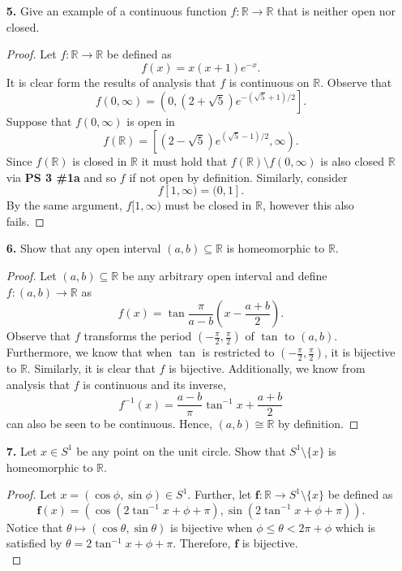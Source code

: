 \documentclass[ 12pt ]{article}
\begin{document}
\begin{enumerate}
	\item[\textbf{5.}] Give an example of a continuous function $f : \mathbb{R} \to \mathbb{R}$ that is neither open nor closed.

		\begin{proof}
			Let $f : \mathbb{R} \to \mathbb{R}$ be defined as $$f(x) = x(x+1)e^{-x}.$$ It is clear form the results of analysis that $f$ is continuous on $\mathbb{R}$. Observe that
			$$f(0, \infty) = \left ( 0, (2 + \sqrt{5})e^{-(\sqrt{5} + 1)/2} \right ].$$ Suppose that $f(0, \infty)$ is open in $$f(\mathbb{R}) = \left [ (2 - \sqrt{5})e^{(\sqrt{5} - 1)/2},
			\infty \right ).$$ Since $f(\mathbb{R})$ is closed in $\mathbb{R}$ it must hold that $f(\mathbb{R}) \setminus f(0, \infty)$ is also closed $\mathbb{R}$ via \textbf{PS 3 \#1a}
			and so $f$ if not open by definition. Similarly, consider $$f[1, \infty) = (0, 1].$$ By the same argument, $f[1, \infty)$ must be closed in $\mathbb{R}$, however this also
			fails.
		\end{proof}


	\item[\textbf{6.}] Show that any open interval $(a, b) \subseteq \mathbb{R}$ is homeomorphic to $\mathbb{R}$.

		\begin{proof}
			Let $(a, b) \subseteq \mathbb{R}$ be any arbitrary open interval and define $f : (a, b) \to \mathbb{R}$ as $$f(x) = \tan \frac{\pi}{a-b}\left(x - \frac{a+b}{2}\right).$$
			Observe that $f$ transforms the period $\left(-\frac{\pi}{2}, \frac{\pi}{2}\right)$ of $\tan$ to $(a, b)$. Furthermore, we know that when $\tan$ is restricted to
			$\left(-\frac{\pi}{2}, \frac{\pi}{2}\right)$, it is bijective to $\mathbb{R}$. Similarly, it is clear that $f$ is bijective. Additionally, we know from analysis that
			$f$ is continuous and its inverse, $$f^{-1}(x) = \frac{a-b}{\pi}\tan^{-1} x + \frac{a+b}{2}$$ can also be seen to be continuous. Hence, $(a, b) \cong \mathbb{R}$ by
			definition.
		\end{proof}


	\item[\textbf{7.}] Let $x \in S^1$ be any point on the unit circle. Show that $S^1 \setminus \{ x \}$ is homeomorphic to $\mathbb{R}$.

		\begin{proof}
			Let $x = (\cos \phi, \sin \phi) \in S^1$. Further, let $\textbf{f} : \mathbb{R} \to S^1 \setminus \{ x \}$ be defined as $$\textbf{f}(x) = (\cos(2\tan^{-1}x + \phi + \pi),
			\sin(2\tan^{-1}x + \phi + \pi)).$$ Notice that $\theta \mapsto (\cos \theta, \sin \theta)$ is bijective when $\phi \leq \theta < 2\pi + \phi$ which is satisfied
			by $\theta = 2\tan^{-1}x + \phi + \pi$. Therefore, $\textbf{f}$ is bijective. \\


\end{proof}
\end{enumerate}
\end{document}
